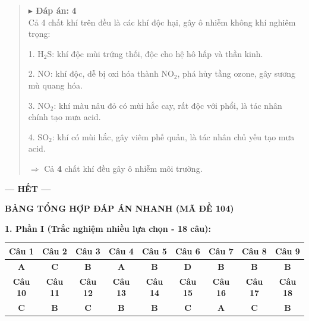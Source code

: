 \documentclass[11pt,a4paper]{article}
\begin{document}
\begin{quote}\small
{\color{myBlue}\textbf{$\blacktriangleright$ Đáp án:}} \textbf{\color{red} 4}\\
Cả 4 chất khí trên đều là các khí độc hại, gây ô nhiễm không khí nghiêm trọng:

1. H$_{2}$S: khí độc mùi trứng thối, độc cho hệ hô hấp và thần kinh.

2. NO: khí độc, dễ bị oxi hóa thành NO$_{2}$, phá hủy tầng ozone, gây sương mù quang hóa.

3. NO$_{2}$: khí màu nâu đỏ có mùi hắc cay, rất độc với phổi, là tác nhân chính tạo mưa acid.

4. SO$_{2}$: khí có mùi hắc, gây viêm phế quản, là tác nhân chủ yếu tạo mưa acid.

$\Rightarrow$ Cả \textbf{4} chất khí đều gây ô nhiễm môi trường.
\end{quote}
\vspace{2pt}

\begin{center}
\textbf{--- HẾT ---}
\end{center}

\vspace{8pt}
\begin{center}
{\color{red!80!black}\large\bfseries BẢNG TỔNG HỢP ĐÁP ÁN NHANH (MÃ ĐỀ 104)}
\end{center}

\textbf{\color{myGreen} 1. Phần I (Trắc nghiệm nhiều lựa chọn - 18 câu):}
\begin{center}
\begin{tabular}{|*{9}{c|}}
\hline
\textbf{Câu 1} & \textbf{Câu 2} & \textbf{Câu 3} & \textbf{Câu 4} & \textbf{Câu 5} & \textbf{Câu 6} & \textbf{Câu 7} & \textbf{Câu 8} & \textbf{Câu 9} \\
\hline
\textbf{\color{red} A} & \textbf{\color{red} C} & \textbf{\color{red} B} & \textbf{\color{red} A} & \textbf{\color{red} B} & \textbf{\color{red} D} & \textbf{\color{red} B} & \textbf{\color{red} B} & \textbf{\color{red} B} \\
\hline
\textbf{Câu 10} & \textbf{Câu 11} & \textbf{Câu 12} & \textbf{Câu 13} & \textbf{Câu 14} & \textbf{Câu 15} & \textbf{Câu 16} & \textbf{Câu 17} & \textbf{Câu 18} \\
\hline
\textbf{\color{red} C} & \textbf{\color{red} B} & \textbf{\color{red} C} & \textbf{\color{red} B} & \textbf{\color{red} B} & \textbf{\color{red} C} & \textbf{\color{red} A} & \textbf{\color{red} C} & \textbf{\color{red} B} \\
\hline
\end{tabular}
\end{center}
\end{document}
